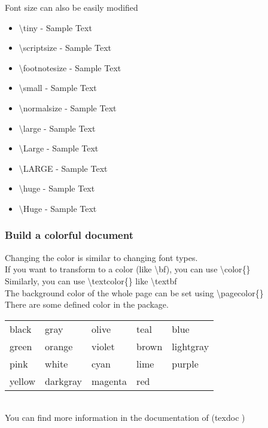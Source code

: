 \documentclass{beamer}
\newcommand{\samplecolorbox}[1]{\fcolorbox{black}{#1}{\color{#1}{\tiny{\phantom{0000}}}} \small{#1}}
\newcommand{\sampletext}[2]{\alert{\textbackslash #1} - {#2{Sample Text}}}
\begin{document}
\begin{frame}
	Font size can also be easily modified
	\begin{itemize}
		\item \sampletext{tiny}{\tiny}
		\item \sampletext{scriptsize}{\scriptsize}
		\item \sampletext{footnotesize}{\footnotesize}
		\item \sampletext{small}{\small}
		\item \sampletext{normalsize}{\normalsize}
		\item \sampletext{large}{\large}
		\item \sampletext{Large}{\Large}
		\item \sampletext{LARGE}{\LARGE}
		\item \sampletext{huge}{\huge}
		\item \sampletext{Huge}{\Huge}
	\end{itemize}
\end{frame}

\begin{frame}
	\frametitle{Build a colorful document}
	Changing the color is similar to changing font types.\\[0.5em]
	If you want to transform to a color (like \alert{\textbackslash bf}), you can use \alert{\textbackslash color}\{\}\\
	Similarly, you can use \alert{\textbackslash textcolor}\{\} like \alert{\textbackslash textbf}\\
	The background color of the whole page can be set using \alert{\textbackslash pagecolor}\{\}\\[0.5em]
	There are some defined color  in the  package.\\[0.5em]
	\begin{tabular}{lllll}
	\samplecolorbox{black}&\samplecolorbox{gray}&\samplecolorbox{olive}&\samplecolorbox{teal}&\samplecolorbox{blue}\\
	\samplecolorbox{green}&\samplecolorbox{orange}&\samplecolorbox{violet}&\samplecolorbox{brown}&\samplecolorbox{lightgray}\\
	\samplecolorbox{pink}&\samplecolorbox{white}&\samplecolorbox{cyan}&\samplecolorbox{lime}&\samplecolorbox{purple}\\
	\samplecolorbox{yellow}&\samplecolorbox{darkgray}&\samplecolorbox{magenta}&\samplecolorbox{red}\\
	\end{tabular}		
	\\[0.5em]
	You can find more information in the documentation of  (\alert{texdoc} )
\end{frame}
\end{document}
